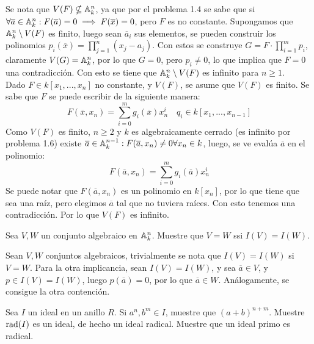 \begin{sol}{1.14}
    Se nota que $V(F)\nsubseteq\mathbb{A}_k^n$, ya que por el problema 1.4 se sabe que si $\forall\overline{a}\in\mathbb{A}_k^n:F(\overline{a})=0\implies F(\overline{x})=0$, pero $F$ es no constante. Supongamos que $\mathbb{A}_k^n\setminus V(F)$ es finito, luego sean $\overline{a}_i$ sus elementos, se pueden construir los polinomios $p_i(\overline{x})=\prod^n_{j=1}(x_j-a_j)$. Con estos se construye $G=F\cdot\prod_{i=1}^mp_i$, claramente $V(G)=\mathbb{A}_k^n$, por lo que $G=0$, pero $p_i\neq 0$, lo que implica que $F=0$ una contradicción. Con esto se tiene que $\mathbb{A}_k^n\setminus V(F)$ es infinito para $n\geq 1$.\\
    Dado $F\in k[x_1,...,x_n]$ no constante, y $V(F)$, se asume que $V(F)$ es finito. Se sabe que $F$ se puede escribir de la siguiente manera:
    \[
        F(\overline{x},x_n)=\sum_{i=0}^mg_i(\overline{x})x_n^i\quad q_i\in k[x_1,...,x_{n-1}]
    \]
    Como $V(F)$ es finito, $n\geq2$ y $k$ es algebraicamente cerrado (es infinito por problema 1.6) existe $\overline{a}\in\mathbb{A}_k^{n-1}:F(\overline{a},x_n)\neq 0\forall x_n\in k$, luego, se ve evalúa $\overline{a}$ en el polinomio:
    \[
        F(\overline{a},x_n)=\sum_{i=0}^mg_i(\overline{a})x_n^i
    \]
    Se puede notar que $F(\overline{a},x_n)$ es un polinomio en $k[x_n]$, por lo que tiene que sea una raíz, pero elegimos $\overline{a}$ tal que no tuviera raíces. Con esto tenemos una contradicción. Por lo que $V(F)$ es infinito.
\end{sol}

\begin{prob}{1.16}
    Sea $V, W$ un conjunto algebraico en $\mathbb{A}_k^n$. Muestre que $V=W$ ssi $I(V)=I(W)$.
\end{prob}

\begin{sol}{1.16}
    Sean $V,W$ conjuntos algebraicos, trivialmente se nota que $I(V)=I(W)$ si $V=W$. Para la otra implicancia, sean $I(V)=I(W)$, y sea $\overline{a}\in V$, y $p\in I(V)=I(W)$, luego $p(\overline{a})=0$, por lo que $\overline{a}\in W$. Análogamente, se consigue la otra contención.
\end{sol}

\begin{prob}{1.18}
    Sea $I$ un ideal en un anillo $R$. Si $a^n, b^m\in I$, muestre que $(a+b)^{n+m}$. Muestre $\operatorname{rad}(I)$ es un ideal, de hecho un ideal radical. Muestre que un ideal primo es radical.
\end{prob}

